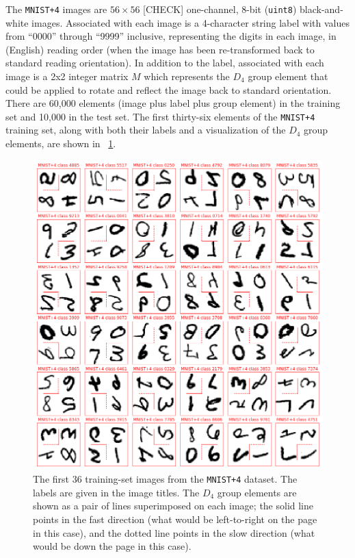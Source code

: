 \documentclass{article}
\newcommand{\figref}[1]{\figurename~\ref{#1}}
\begin{document}
The \texttt{MNIST+4} images are $56\times 56$ [CHECK] one-channel, 8-bit (\texttt{uint8}) black-and-white images.
Associated with each image is a 4-character string label with values from ``0000'' through ``9999'' inclusive, representing the digits in each image, in (English) reading order (when the image has been re-transformed back to standard reading orientation).
In addition to the label, associated with each image is a 2x2 integer matrix $M$ which represents the $D_4$ group element that could be applied to rotate and reflect the image back to standard orientation.
There are 60,000 elements (image plus label plus group element) in the training set and 10,000 in the test set.
The first thirty-six elements of the \texttt{MNIST+4} training set, along with both their labels and a visualization of the $D_4$ group elements, are shown in \figref{fig:4}.
\begin{figure}[t!]
\includegraphics[width=\textwidth]{../notebooks/MNIST+4.png}
\caption{The first 36 training-set images from the \texttt{MNIST+4} dataset. The labels are given in the image titles. The $D_4$ group elements are shown as a pair of lines superimposed on each image; the solid line points in the fast direction (what would be left-to-right on the page in this case), and the dotted line points in the slow direction (what would be down the page in this case).\label{fig:4}}
\end{figure}
\end{document}
